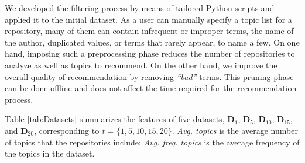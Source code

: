 We developed the filtering process by means of tailored Python scripts and 
applied it to the initial dataset. As a \GH user can manually specify a topic 
list for a repository, many of them can contain infrequent or improper terms, 
\ie the name 
of the author, duplicated values, or terms that rarely appear, to name a few. 
On one hand, imposing such a preprocessing phase reduces the number of 
repositories to analyze as well as topics to recommend. On the other hand, we 
improve the overall quality of recommendation by removing \emph{``bad''} terms. 
This pruning phase can be done offline and does not affect the time required 
for the recommendation process.



Table \ref{tab:Datasets} summarizes the features of five datasets, \ie 
\textbf{D$_1$}, \textbf{D$_5$}, \textbf{D$_{10}$}, \textbf{D$_{15}$}, and 
\textbf{D$_{20}$}, corresponding to \emph{t} = $\{1, 5, 10, 15, 20\}$. 
\emph{Avg. topics} is the average number of topics that the repositories 
include; \emph{Avg. freq. topics} is the average frequency of the topics in the 
dataset.%


%


